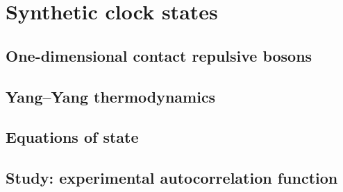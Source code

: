 
\renewcommand{\thechapter}{4}

\chapter{Synthetic clock states}

\section{One-dimensional contact repulsive bosons}

\section{Yang--Yang thermodynamics}

\section{Equations of state}

\section{Study: experimental autocorrelation function}


